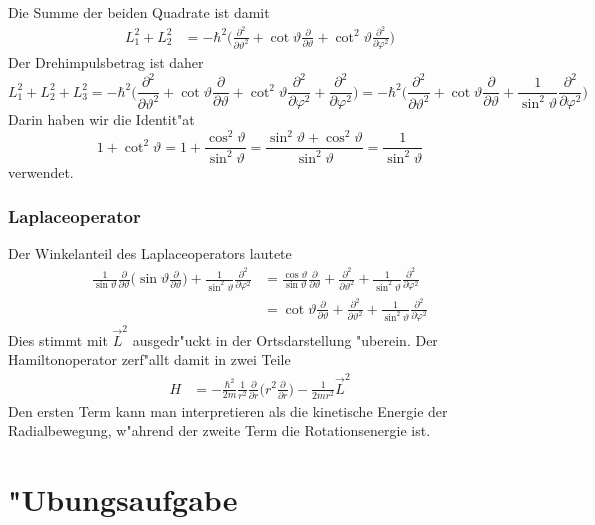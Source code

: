 Die Summe der beiden Quadrate ist damit
\begin{align*}
L_1^2+L_2^2
&=
-\hbar^2\biggl(
\frac{\partial^2}{\partial\vartheta^2}
+
\cot\vartheta\frac{\partial}{\partial\vartheta}
+
\cot^2\vartheta\frac{\partial^2}{\partial\varphi^2}
\biggr)
\end{align*}
Der Drehimpulsbetrag ist daher
\[
L_1^2+L_2^2+L_3^2
=
-\hbar^2\biggl(
\frac{\partial^2}{\partial\vartheta^2}
+
\cot\vartheta\frac{\partial}{\partial\vartheta}
+
\cot^2\vartheta\frac{\partial^2}{\partial\varphi^2}
+
\frac{\partial^2}{\partial\varphi^2}
\biggr)
=
-\hbar^2\biggl(
\frac{\partial^2}{\partial\vartheta^2}
+
\cot\vartheta\frac{\partial}{\partial\vartheta}
+
\frac1{\sin^2\vartheta}\frac{\partial^2}{\partial\varphi^2}
\biggr)
\]
Darin haben wir die Identit"at
\[
1+\cot^2\vartheta
=
1+\frac{\cos^2\vartheta}{\sin^2\vartheta}
=
\frac{\sin^2\vartheta+\cos^2\vartheta}{\sin^2\vartheta}
=
\frac{1}{\sin^2\vartheta}
\]
verwendet.

\subsubsection{Laplaceoperator}
Der Winkelanteil des Laplaceoperators lautete
\begin{align*}
\frac1{\sin\vartheta}\frac{\partial}{\partial\vartheta}\biggl(
\sin\vartheta\frac{\partial}{\partial\vartheta}
\biggr)
+\frac1{\sin^2\vartheta}\frac{\partial^2}{\partial\varphi^2}
&=
\frac{\cos\vartheta}{\sin\vartheta}\frac{\partial}{\partial\vartheta}
+
\frac{\partial^2}{\partial\vartheta^2}
+
\frac{1}{\sin^2\vartheta}\frac{\partial^2}{\partial\varphi^2}
\\
&=
\cot\vartheta\frac{\partial}{\partial\vartheta}
+
\frac{\partial^2}{\partial\vartheta^2}
+
\frac{1}{\sin^2\vartheta}\frac{\partial^2}{\partial\varphi^2}
\end{align*}
Dies stimmt mit $\vec L^2$ ausgedr"uckt in der Ortsdarstellung "uberein.
Der Hamiltonoperator zerf"allt damit in zwei Teile
\begin{align*}
H
&=-\frac{\hbar^2}{2m}
\frac1{r^2}\frac{\partial}{\partial r}\biggl(r^2\frac{\partial}{\partial r}\biggr)
-\frac{1}{2mr^2}\vec L^2
\end{align*}
Den ersten Term kann man interpretieren als die kinetische Energie
der Radialbewegung, w"ahrend der zweite Term die Rotationsenergie ist.

\section*{"Ubungsaufgabe}
\begin{uebungsaufgaben}
\item

\end{uebungsaufgaben}
